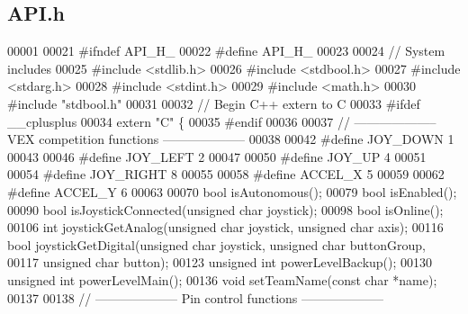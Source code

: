 \subsection{A\+P\+I.\+h}
\label{API_8h_source}

\begin{DoxyCode}
00001 
00021 \textcolor{preprocessor}{#ifndef API\_H\_}
00022 \textcolor{preprocessor}{#define API\_H\_}
00023 
00024 \textcolor{comment}{// System includes}
00025 \textcolor{preprocessor}{#include <stdlib.h>}
00026 \textcolor{preprocessor}{#include <stdbool.h>}
00027 \textcolor{preprocessor}{#include <stdarg.h>}
00028 \textcolor{preprocessor}{#include <stdint.h>}
00029 \textcolor{preprocessor}{#include <math.h>}
00030 \textcolor{preprocessor}{#include "stdbool.h"}
00031 
00032 \textcolor{comment}{// Begin C++ extern to C}
00033 \textcolor{preprocessor}{#ifdef \_\_cplusplus}
00034 \textcolor{keyword}{extern} \textcolor{stringliteral}{"C"} \{
00035 \textcolor{preprocessor}{#endif}
00036 
00037 \textcolor{comment}{// -------------------- VEX competition functions --------------------}
00038 
00042 \textcolor{preprocessor}{#define JOY\_DOWN 1}
00043 
00046 \textcolor{preprocessor}{#define JOY\_LEFT 2}
00047 
00050 \textcolor{preprocessor}{#define JOY\_UP 4}
00051 
00054 \textcolor{preprocessor}{#define JOY\_RIGHT 8}
00055 
00058 \textcolor{preprocessor}{#define ACCEL\_X 5}
00059 
00062 \textcolor{preprocessor}{#define ACCEL\_Y 6}
00063 
00070 \textcolor{keywordtype}{bool} isAutonomous();
00079 \textcolor{keywordtype}{bool} isEnabled();
00090 \textcolor{keywordtype}{bool} isJoystickConnected(\textcolor{keywordtype}{unsigned} \textcolor{keywordtype}{char} joystick);
00098 \textcolor{keywordtype}{bool} isOnline();
00106 \textcolor{keywordtype}{int} joystickGetAnalog(\textcolor{keywordtype}{unsigned} \textcolor{keywordtype}{char} joystick, \textcolor{keywordtype}{unsigned} \textcolor{keywordtype}{char} axis);
00116 \textcolor{keywordtype}{bool} joystickGetDigital(\textcolor{keywordtype}{unsigned} \textcolor{keywordtype}{char} joystick, \textcolor{keywordtype}{unsigned} \textcolor{keywordtype}{char} buttonGroup,
00117        \textcolor{keywordtype}{unsigned} \textcolor{keywordtype}{char} button);
00123 \textcolor{keywordtype}{unsigned} \textcolor{keywordtype}{int} powerLevelBackup();
00130 \textcolor{keywordtype}{unsigned} \textcolor{keywordtype}{int} powerLevelMain();
00136 \textcolor{keywordtype}{void} setTeamName(\textcolor{keyword}{const} \textcolor{keywordtype}{char} *name);
00137 
00138 \textcolor{comment}{// -------------------- Pin control functions --------------------}

\end{DoxyCode}
